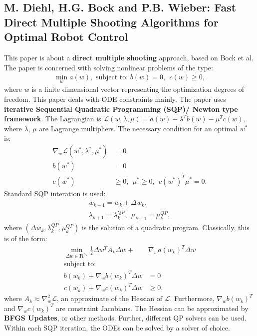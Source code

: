 \documentclass[11pt, a4paper]{article}
\theoremstyle{definition}
\begin{document}
\subsection{M. Diehl, H.G. Bock and P.B. Wieber: Fast Direct Multiple Shooting Algorithms for Optimal Robot Control}
This paper is about a \textbf{direct multiple shooting} approach, based on Bock et al.
The paper is concerned with solving nonlinear problems of the type:
\begin{align*}
\min_w a(w), \text{ subject to: } b(w)=0, \ \ c(w) \geq 0,
\end{align*}
where $w$ is a finite dimensional vector representing the optimization degrees of freedom. This paper deals with ODE constraints mainly.
The paper uses \textbf{iterative Sequential Quadratic Programming (SQP)/ Newton type framework}. 
The Lagrangian is $\mathcal{L}(w,\lambda,\mu)=a(w) - \lambda^T b(w) - \mu^T c(w)$, where $\lambda$, $\mu$ are Lagrange multipliers. The necessary condition for an optimal $w^*$ is:
\begin{align*}
\nabla_w \mathcal{L}(w^*,\lambda^*,\mu^*) &=0\\
b(w^*) &=0\\
c(w^*) &\geq 0, \ \ \mu^* \geq 0, \ \ c(w^*)^T \mu^* =0.
\end{align*}
Standard SQP interation is used:
\begin{align*}
w_{k+1}= w_k + \Delta w_k,\\
\lambda_{k+1}=\lambda_k^{QP}, \ \ \mu_{k+1}= \mu_k^{QP},
\end{align*}
where $(\Delta w_k,\lambda_k^{QP}, \mu_k^{QP})$ is the solution of a quadratic program.
Classically, this is of the form:
\begin{align*}
\min_{\Delta w \in \mathbf{R}^{n_w}} \frac{1}{2} \Delta w^T A_k \Delta w +& \nabla_w a(w_k)^T \Delta w\\
\text{subject to:} \ \ \ \ \ &\\
b(w_k) + \nabla_w b(w_k)^T \Delta w &=0\\
c(w_k) + \nabla_w c(w_k)^T \Delta w  &\geq 0,
\end{align*}
where $A_k \approx \nabla^2_w \mathcal{L}$, an approximate of the Hessian of $\mathcal{L}$. Furthermore, $\nabla_w b(w_k)^T$ and $\nabla_w c(w_k)^T$ are constraint Jacobians.
The Hessian can be approximated by \textbf{BFGS Updates}, or other methods. Further, different QP solvers can be used.
Within each SQP iteration, the ODEs can be solved by a solver of choice.
\end{document}
